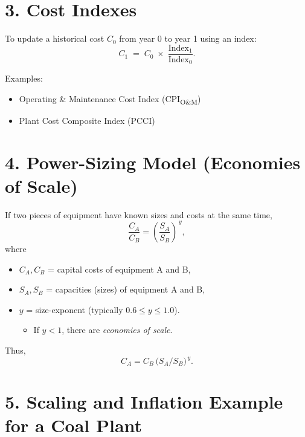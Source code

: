 \documentclass[11pt]{article}
\begin{document}
\section*{3. Cost Indexes}

To update a historical cost \( C_0 \) from year 0 to year 1 using an index:
\begin{equation}
  C_1 \;=\; C_0 \; \times \; \frac{\text{Index}_1}{\text{Index}_0}.
  \label{eq:cost-index}
\end{equation}

\noindent Examples:
\begin{itemize}
  \item Operating \& Maintenance Cost Index (CPI\textsubscript{O\&M})
  \item Plant Cost Composite Index (PCCI)
\end{itemize}

\section*{4. Power-Sizing Model (Economies of Scale)}

If two pieces of equipment have known sizes and costs at the same time,
\[
  \frac{C_A}{C_B} 
  = \left(\frac{S_A}{S_B}\right)^{\,y},
\]
where
\begin{itemize}
  \item \(C_A, C_B\) = capital costs of equipment A and B,
  \item \(S_A, S_B\) = capacities (sizes) of equipment A and B,
  \item \(y\) = size-exponent (typically \(0.6 \le y \le 1.0\)).  
    \begin{itemize}
      \item If \(y < 1\), there are \emph{economies of scale}.
    \end{itemize}
\end{itemize}
Thus,
\[
  C_A 
  = C_B \,\bigl(S_A / S_B\bigr)^{\,y}.
\]

\section*{5. Scaling and Inflation Example for a Coal Plant}
\end{document}
